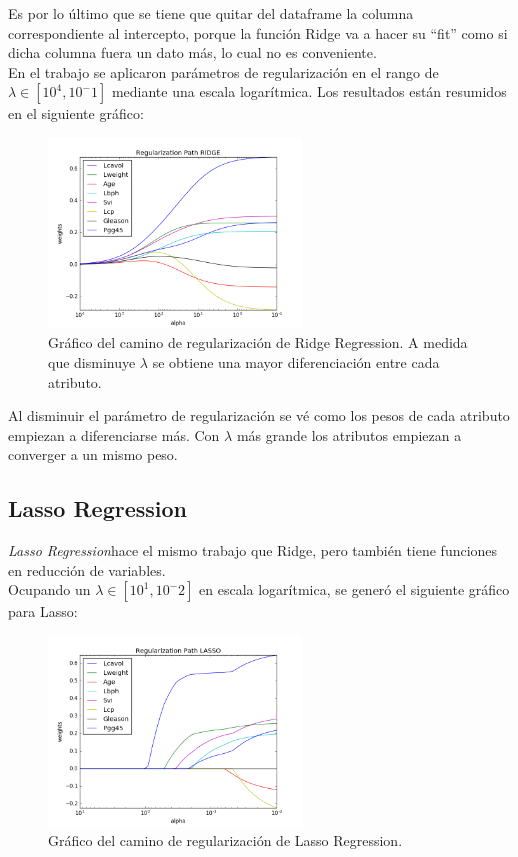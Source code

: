 \documentclass[letter, 10pt]{article}
\begin{document}
Es por lo último que se tiene que quitar del dataframe la columna
correspondiente al intercepto, porque la función Ridge va a hacer su ``fit''
como si dicha columna fuera un dato más, lo cual no es conveniente.\\


En el trabajo se aplicaron parámetros de regularización en el rango de $\lambda
\in [10^4,10^-1]$ mediante una escala logarítmica. Los resultados están resumidos
en el siguiente gráfico:

\begin{figure}[H]
  \centering
  \includegraphics[width=0.6\textwidth]{Images/p3_fig1.png} 
  \caption{Gráfico del camino de regularización de Ridge Regression. A medida
    que disminuye $\lambda$ se obtiene una mayor diferenciación entre cada atributo.}
  \label{fig:p3_g1}
\end{figure}

Al disminuir el parámetro de regularización se vé como los pesos de cada
atributo empiezan a diferenciarse más. Con $\lambda$ más grande los atributos
empiezan a converger a un mismo peso.
\subsection{Lasso Regression}
\textit{Lasso Regression}hace el mismo trabajo que Ridge, pero también tiene
funciones en reducción de variables.\\

Ocupando un $\lambda \in [10^1,10^-2]$ en escala logarítmica, se generó el
siguiente gráfico para Lasso:


\begin{figure}[H]
  \centering
  \includegraphics[width=0.6\textwidth]{Images/p3_fig2.png} 
  \caption{Gráfico del camino de regularización de Lasso Regression.}
  \label{fig:p3_g1}
\end{figure}
\end{document}
